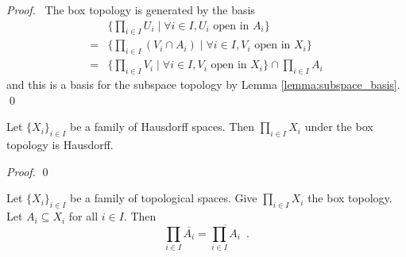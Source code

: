 \begin{proof}
    \pf\ The box topology is generated by the basis
    \begin{align*}
        & \{ \prod_{i \in I} U_i \mid \forall i \in I, U_i \text{ open in } A_i \} \\
        = & \{ \prod_{i \in I} (V_i \cap A_i) \mid \forall i \in I, V_i \text{ open in } X_i \} \\
        = & \{ \prod_{i \in I} V_i \mid \forall i \in I, V_i \text{ open in } X_i \} \cap \prod_{i \in I} A_i
    \end{align*}
    and this is a basis for the subspace topology by Lemma \ref{lemma:subspace_basis}. \qed
\end{proof}

\begin{proposition}
    Let $\{ X_i \}_{i \in I}$ be a family of Hausdorff spaces. Then $\prod_{i \in I} X_i$ under the box topology is Hausdorff.
\end{proposition}

\begin{proof}
    \pf
    \qed
\end{proof}

\begin{proposition}[AC]
    Let $\{ X_i \}_{i \in I}$ be a family of topological spaces. Give $\prod_{i \in I} X_i$ the box topology.
    Let $A_i \subseteq X_i$ for all $i \in I$.
    Then
    \[ \prod_{i \in I} \overline{A_i} = \overline{\prod_{i \in I} A_i} \enspace . \]
\end{proposition}

